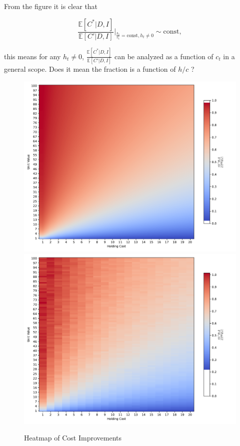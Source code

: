 \documentclass[a4paper,12pt]{article}
\theoremstyle{definition}
\begin{document}
	From the figure it is clear that
	
	\begin{equation}
		\frac{\mathbb{E}[C^*|D,I]}{\mathbb{E}[C'|D,I]}\bigg|_{\frac{h_t}{c_t} = \text{const}, h_t\neq 0}\sim \text{const},
	\end{equation}

	this means for any $h_t\neq 0$, $\frac{\mathbb{E}[C^*|D,I]}{\mathbb{E}[C'|D,I]}$ can be analyzed as a function of $c_t$ in a general scope. {\color{red} Does it mean the fraction is a function of $h/c$ ?}
	
	\begin{figure}[h!]
		\centering
		\includegraphics[width=\textwidth]{figures/analytical_heatmap.pdf}
		\includegraphics[width=\textwidth]{figures/numerical_heatmap.pdf}
		\caption{Heatmap of Cost Improvements}
	\end{figure}
	
\end{document}
